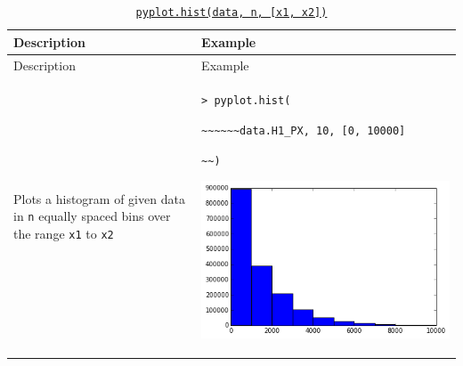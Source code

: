 \documentclass[10pt,a4paperpaper,]{article}
\begin{document}
\begin{longtable}[]{@{}ll@{}}
\caption{\href{http://matplotlib.org/api/pyplot_api.html\#matplotlib.pyplot.hist}{\texttt{pyplot.hist(data,\ n,\ {[}x1,\ x2{]})}}}\tabularnewline
\toprule
\begin{minipage}[b]{0.47\columnwidth}\raggedright\strut
Description\strut
\end{minipage} & \begin{minipage}[b]{0.47\columnwidth}\raggedright\strut
Example\strut
\end{minipage}\tabularnewline
\midrule
\endfirsthead
\toprule
\begin{minipage}[b]{0.47\columnwidth}\raggedright\strut
Description\strut
\end{minipage} & \begin{minipage}[b]{0.47\columnwidth}\raggedright\strut
Example\strut
\end{minipage}\tabularnewline
\midrule
\endhead
\begin{minipage}[t]{0.47\columnwidth}\raggedright\strut
Plots a histogram of given data in \texttt{n} equally spaced bins over
the range \texttt{x1} to \texttt{x2}\strut
\end{minipage} & \begin{minipage}[t]{0.47\columnwidth}\raggedright\strut
\texttt{\textgreater{}\ pyplot.hist(}

\texttt{\textasciitilde{}\textasciitilde{}\textasciitilde{}\textasciitilde{}\textasciitilde{}\textasciitilde{}data.H1\_PX,\ 10,\ {[}0,\ 10000{]}}

\texttt{\textasciitilde{}\textasciitilde{})}

\includegraphics[width=\textwidth]{assets/01-hist.png}\strut
\end{minipage}\tabularnewline
\bottomrule
\end{longtable}
\end{document}
